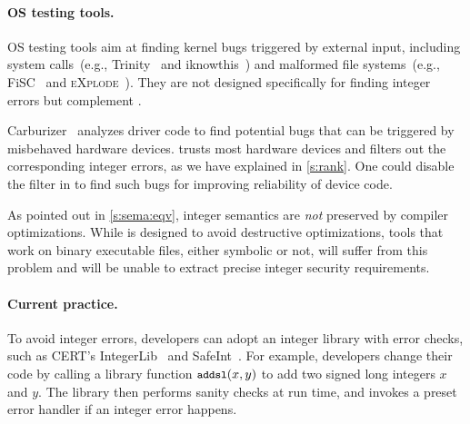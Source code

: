\paragraph{OS testing tools.}
OS testing tools aim at finding kernel bugs triggered by external input,
including system calls~(e.g., Trinity~\cite{trinity} and
iknowthis~\cite{iknowthis}) and malformed file systems~(e.g.,
FiSC~\cite{fisc:yang} and \textsc{eXplode}~\cite{explode:yang}).
They are not designed specifically for finding integer errors
but complement \sys.
\fi

Carburizer~\cite{kadav:tolerating} analyzes driver code to find
potential bugs that can be triggered by misbehaved hardware devices.
\sys trusts most hardware devices and filters out the corresponding
integer errors, as we have explained in \autoref{s:rank}.  One could
disable the filter in \sys to find such bugs for improving reliability
of device code.
\fi

As pointed out in \autoref{s:sema:eqv}, integer semantics
are \emph{not} preserved by compiler optimizations.
While \sys is designed to avoid destructive optimizations, tools that
work on binary executable files, either symbolic or not,
will suffer from this problem and will be unable to extract
precise integer security requirements.
\fi

\paragraph{Current practice.}
To avoid integer errors, developers can adopt
an integer library with error checks, such as CERT's
IntegerLib~\cite[INT03-C]{seacord:secure-c}
and SafeInt~\cite{safeint}.
For example, developers
change their code by calling a library function $\cc{addsl}(x, y)$
to add two signed long integers $x$ and $y$.
The library then performs sanity checks at run time, and invokes a
preset error handler if an integer error happens.


